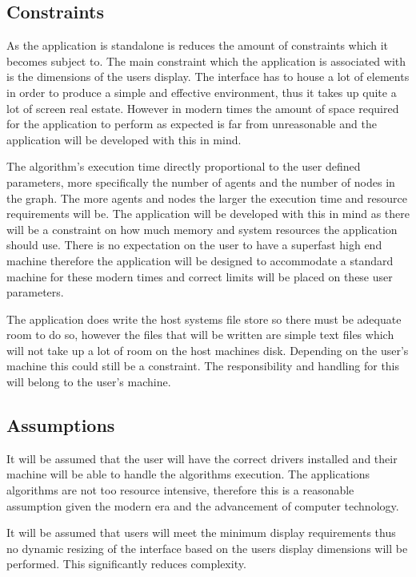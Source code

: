 \subsection{Constraints}

As the application is standalone is reduces the amount of constraints which it becomes subject to. The main constraint which the application is associated with is the dimensions of the users display. The interface has to house a lot of elements in order to produce a simple and effective environment, thus it takes up quite a lot of screen real estate. However in modern times the amount of space required for the application to perform as expected is far from unreasonable and the application will be developed with this in mind.

The algorithm’s execution time directly proportional to the user defined parameters, more specifically the number of agents and the number of nodes in the graph. The more agents and nodes the larger the execution time and resource requirements will be. The application will be developed with this in mind as there will be a constraint on how much memory and system resources the application should use. There is no expectation on the user to have a superfast high end machine therefore the application will be designed to accommodate a standard machine for these modern times and correct limits will be placed on these user parameters.

The application does write the host systems file store so there must be adequate room to do so, however the files that will be written are simple text files which will not take up a lot of room on the host machines disk. Depending on the user’s machine this could still be a constraint. The responsibility and handling for this will belong to the user’s machine.

\subsection{Assumptions}

It will be assumed that the user will have the correct drivers installed and their machine will be able to handle the algorithms execution. The applications algorithms are not too resource intensive, therefore this is a reasonable assumption given the modern era and the advancement of computer technology.

It will be assumed that users will meet the minimum display requirements thus no dynamic resizing of the interface based on the users display dimensions will be performed. This significantly reduces complexity.

